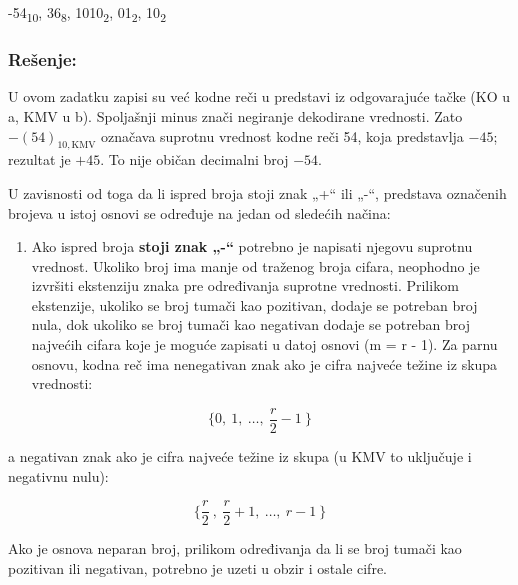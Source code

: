 \documentclass[a4paper,11pt]{article}
\numberwithin{equation}{section}
\newcommand{\napomena}[1]{\begin{tcolorbox}[colback=gray!10,colframe=black,boxrule=0.5pt,breakable]#1\end{tcolorbox}}
\begin{document}
-54\textsubscript{10}, 36\textsubscript{8}, 1010\textsubscript{2}, 01\textsubscript{2}, 10\textsubscript{2}



\subsubsection*{Rešenje:}

\napomena{U ovom zadatku zapisi su već kodne reči u predstavi iz odgovarajuće tačke (KO u a, KMV u b). Spoljašnji minus znači negiranje dekodirane vrednosti. Zato $-(54)_{10,\mathrm{KMV}}$ označava suprotnu vrednost kodne reči 54, koja predstavlja $-45$; rezultat je $+45$. To nije običan decimalni broj $-54$.}

U zavisnosti od toga da li ispred broja stoji znak „+“ ili „-“, predstava označenih brojeva u istoj osnovi se određuje na jedan od sledećih načina:



\begin{enumerate}[label=\arabic*),start=1,leftmargin=*]
\item Ako ispred broja \textbf{stoji znak „-“} potrebno je napisati njegovu suprotnu vrednost. Ukoliko broj ima manje od traženog broja cifara, neophodno je izvršiti ekstenziju znaka pre određivanja suprotne vrednosti. Prilikom ekstenzije, ukoliko se broj tumači kao pozitivan, dodaje se potreban broj nula, dok ukoliko se broj tumači kao negativan dodaje se potreban broj najvećih cifara koje je moguće zapisati u datoj osnovi (m = r - 1). Za parnu osnovu, kodna reč ima nenegativan znak ako je cifra najveće težine iz skupa vrednosti:

\end{enumerate}


\begin{equation}\label{eq:2.6.1}
\{ 0,\ 1,\ \ldots,\ \frac{r}{2} - 1\ \}
\end{equation}


a negativan znak ako je cifra najveće težine iz skupa (u KMV to uključuje i negativnu nulu):



\begin{equation}\label{eq:2.6.2}
\{\frac{r}{2}\ ,\ \frac{r}{2} + 1,\ \ldots,\ r - 1\ \}
\end{equation}


Ako je osnova neparan broj, prilikom određivanja da li se broj tumači kao pozitivan ili negativan, potrebno je uzeti u obzir i ostale cifre.
\end{document}
